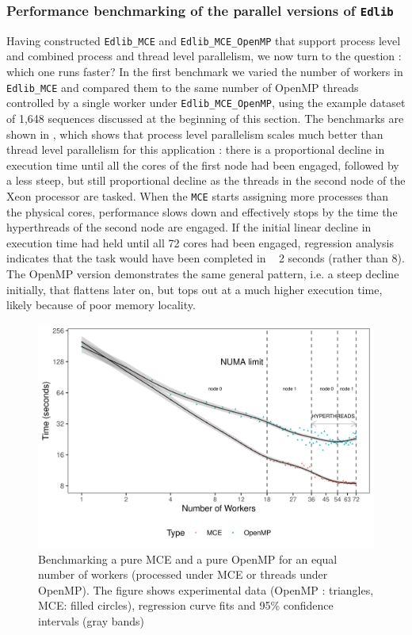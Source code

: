 \documentclass[10pt]{article}
\begin{document}
\subsubsection{Performance benchmarking of the parallel versions of \texttt{Edlib} }
Having constructed \texttt{Edlib\_MCE} and \texttt{Edlib\_MCE\_OpenMP} that support process level and combined process and thread level parallelism, we now turn to the question : which one runs faster? In the first benchmark we varied the number of workers in \texttt{Edlib\_MCE} and compared them to the same number of OpenMP threads controlled by a single worker under \texttt{Edlib\_MCE\_OpenMP}, using the example dataset of 1,648 sequences discussed at the beginning of this section. The benchmarks are shown in , which shows that process level parallelism scales much better than thread level parallelism for this application : there is a proportional decline in execution time until all the cores of the first node had been engaged, followed by a less steep, but still proportional decline as the threads in the second node of the Xeon processor are tasked. When the \texttt{MCE} starts assigning more processes than the physical cores, performance slows down and effectively stops by the time the hyperthreads of the second node are engaged. If the initial linear decline in execution time had held until all 72 cores had been engaged, regression analysis indicates that the task would have been completed in ~ 2 seconds (rather than 8). The OpenMP version demonstrates the same general pattern, i.e. a steep decline initially, that flattens later on, but tops out at a much higher execution time, likely because of poor memory locality.   

\begin{figure}[H]
\centering  
\includegraphics[scale=1]{timings_MCE_OMP.png}
\caption{Benchmarking a pure MCE and a pure OpenMP for an equal number of workers (processed under MCE or threads under OpenMP). The figure shows experimental data (OpenMP : triangles, MCE: filled circles), regression curve fits and 95\% confidence intervals (gray bands)}
\label{fig:EqNumOfWorkers}
\end{figure}
\end{document}
